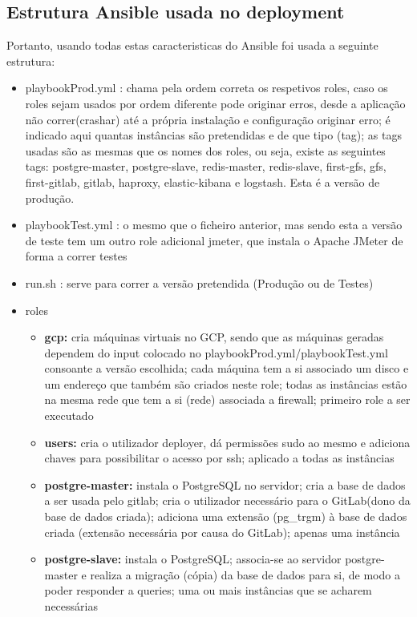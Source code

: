\documentclass{article}
\begin{document}
\subsection{Estrutura Ansible usada no deployment}
Portanto, usando todas estas caracteristicas do Ansible foi usada a seguinte estrutura:
\begin{itemize}
    \item playbookProd.yml : chama pela ordem correta os respetivos roles, caso os roles sejam usados por ordem diferente pode originar erros, desde a aplicação não correr(crashar) até a própria instalação e configuração originar erro; é indicado aqui quantas instâncias são pretendidas e de que tipo (tag); as tags usadas são as mesmas que os nomes dos roles, ou seja, existe as seguintes tags: postgre-master, postgre-slave, redis-master, redis-slave, first-gfs, gfs, first-gitlab, gitlab, haproxy, elastic-kibana e logstash. Esta é a versão de produção.
    \item playbookTest.yml : o mesmo que o ficheiro anterior, mas sendo esta a versão de teste tem um outro role adicional jmeter, que instala o Apache JMeter de forma a correr testes
    \item run.sh : serve para correr a versão pretendida (Produção ou de Testes) 
    \item roles
        \begin{itemize}
            \item \textbf{gcp:} cria máquinas virtuais no GCP, sendo que as máquinas geradas dependem do input colocado no playbookProd.yml/playbookTest.yml consoante a versão escolhida; cada máquina tem a si associado um disco e um endereço que também são criados neste role; todas as instâncias estão na mesma rede que tem a si (rede) associada a firewall; primeiro role a ser executado
            \item \textbf{users:} cria o utilizador deployer, dá permissões sudo ao mesmo e adiciona chaves para possibilitar o acesso por ssh; aplicado a todas as instâncias
        	\item \textbf{postgre-master:} instala o PostgreSQL no servidor; cria a base de dados a ser usada pelo gitlab; cria o utilizador necessário para o GitLab(dono da base de dados criada); adiciona uma extensão (pg\_trgm) à base de dados criada (extensão necessária por causa do GitLab); apenas uma instância
        	\item \textbf{postgre-slave:} instala o PostgreSQL; associa-se ao servidor postgre-master e realiza a migração (cópia) da base de dados para si, de modo a poder responder a queries; uma ou mais instâncias que se acharem necessárias

\end{itemize}
\end{itemize}
\end{document}
